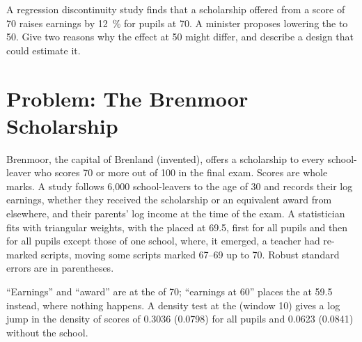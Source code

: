 \begin{exercise}[$\star\star\star$]\label{exo:b3:regression-discontinuity:12}
A regression discontinuity study finds that a scholarship offered from a score
of 70 raises earnings by 12~\% for pupils at 70. A minister proposes lowering
the  to 50. Give two reasons why the effect at 50 might differ, and
describe a design that could estimate it.
\end{exercise}

\section{Problem: The Brenmoor Scholarship}\label{sec:b3:regression-discontinuity:problem}

\begin{problem}\label{pb:b3:regression-discontinuity:scholarship}
Brenmoor, the capital of Brenland (invented), offers a scholarship to every
school-leaver who scores 70 or more out of 100 in the final exam. Scores are
whole marks. A study follows 6{,}000 school-leavers to the age of 30 and records
their log earnings, whether they received the scholarship or an equivalent award
from elsewhere, and their parents' log income at the time of the exam. A
statistician fits  with triangular weights, with the
 placed at 69.5, first for all pupils and then for all pupils except those
of one school, where, it emerged, a teacher had re-marked scripts, moving some
scripts marked 67--69 up to 70. Robust
standard errors are in parentheses. %

\begin{center}\small
{}
\end{center}
``Earnings'' and ``award'' are at the  of 70; ``earnings at 60'' places
the  at 59.5 instead, where nothing happens. A density test at the 
(window 10) gives a log jump in the density of scores of 0.3036 (0.0798) for all
pupils and 0.0623 (0.0841) without the school. %


\end{problem}
